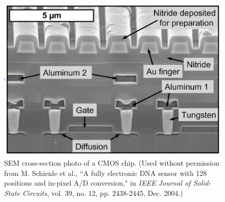\begin{figure}[tb]
\centering
\includegraphics[width=.65\columnwidth]{cmos_xsection_photo.png}
\caption{SEM cross-section photo of a CMOS chip. {\small(Used without permission from M. Schienle et al., ``A fully electronic DNA sensor with 128 positions and in-pixel A/D conversion," in \emph{IEEE Journal of Solid-State Circuits}, vol. 39, no. 12, pp. 2438-2445, Dec. 2004.)}}
\label{fig:cmos_photo}
\end{figure}
